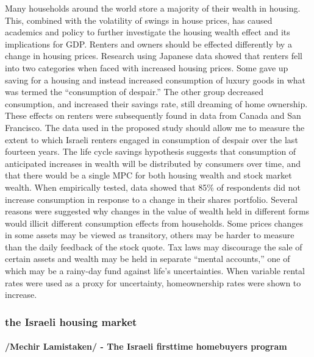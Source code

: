 \documentclass[12pt,a4paper,]{article}
\begin{document}
Many households around the world store a majority of their wealth in
housing. This, combined with the volatility of swings in house prices,
has caused academics and policy to further investigate the housing
wealth effect and its implications for GDP.\autocite{Gan2010} Renters
and owners should be effected differently by a change in housing prices.
Research using Japanese data showed that renters fell into two
categories when faced with increased housing prices. Some gave up saving
for a housing and instead increased consumption of luxury goods in what
was termed the ``consumption of despair.'' The other group decreased
consumption, and increased their savings rate, still dreaming of home
ownership. These effects on renters were subsequently found in data from
Canada and San Francisco.\autocite{Sheiner_1995} The data used in the
proposed study should allow me to measure the extent to which Israeli
renters engaged in consumption of despair over the last fourteen years.
The life cycle savings hypothesis suggests that consumption of
anticipated increases in wealth will be distributed by consumers over
time, and that there would be a single MPC for both housing wealth and
stock market wealth. When empirically tested, data showed that 85\% of
respondents did not increase consumption in response to a change in
their shares portfolio. Several reasons were suggested why changes in
the value of wealth held in different forms would illicit different
consumption effects from households. Some prices changes in some assets
may be viewed as transitory, others may be harder to measure than the
daily feedback of the stock quote. Tax laws may discourage the sale of
certain assets and wealth may be held in separate ``mental accounts,''
one of which may be a rainy-day fund against life's uncertainties. When
variable rental rates were used as a proxy for uncertainty,
homeownership rates were shown to increase.\autocite{CQS2005}

\subsubsection{the Israeli housing
market}\label{the-israeli-housing-market}

\paragraph{/Mechir Lamistaken/ - The Israeli firsttime homebuyers
program}\label{mechir-lamistaken---the-israeli-firsttime-homebuyers-program}
\end{document}
